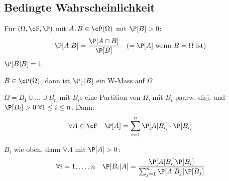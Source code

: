 \subsection{Bedingte Wahrscheinlichkeit}
\shortdefinition Für $(\Omega, \cF, \P)$ mit $A, B \in \cP(\Omega)$ mit $\P[B] > 0$:
\[
    \P[A | B] = \frac{\P[A \cap B]}{\P[B]} \quad (= \P[A] \text{ wenn $B = \Omega$ ist})
\]
\shortremark $\P[B | B] = 1$

\shorttheorem $B \in \cP(\Omega)$, dann ist $\P[ \cdot | B]$ ein W-Mass auf $\Omega$

\shorttheorem[Totale W.] $\Omega = B_1 \cup \dots \cup B_n$ mit $B_i$s eine Partition von $\Omega$, mit $B_i$ paarw. disj. und $\P[B_i] > 0\; \forall 1 \leq i \leq n$. Dann:
\[
    \forall A \in \cF \quad \P[A] = \sum_{i = 1}^{n} \P[A | B_i] \cdot \P[B_i]
\]

\shorttheorem[Bayes] $B_i$ wie oben, dann $\forall A$ mit $\P[A] > 0$:
\[
    \forall i = 1, \ldots, n \quad \P[B_i | A] = \frac{\P[A | B_i] \P[B_i]}{\sum_{j = 1}^{n} \P[A | B_j] \P[B_j]}
\]
